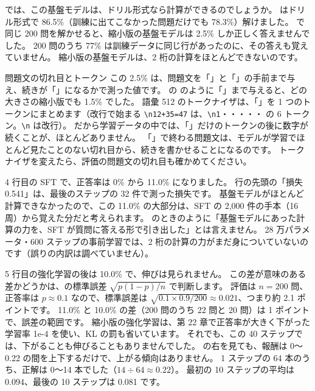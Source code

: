 では、この基盤モデルは、ドリル形式なら計算ができるのでしょうか。
 はドリル形式で 86.5\%（訓練に出てこなかった問題だけでも 78.3\%）解けました。
 で同じ 200 問を解かせると、縮小版の基盤モデルは 2.5\% しか正しく答えませんでした。
200 問のうち 77\% は訓練データに同じ行があったのに、その答えも覚えていません。
縮小版の基盤モデルは、2 桁の計算をほとんどできないのです。

\begin{caution}{問題文の切れ目とトークン}
この 2.5\% は、問題文を「」と「\code{=}」の手前まで与え、続きが「」になるかで測った値です。
 の  のように「」まで与えると、どの大きさの縮小版でも 1.5\% でした。
語彙 512 のトークナイザは、「」を 1 つのトークンにまとめます（改行で始まる \texttt{\textbackslash n12+35=47} は、\texttt{\textbackslash n1}・・・・・ の 6 トークン。\texttt{\textbackslash n} は改行）。
だから学習データの中では、「\code{=}」だけのトークンの後に数字が続くことが、ほとんどありません。
「\code{=}」で終わる問題文は、モデルが学習でほとんど見たことのない切れ目から、続きを書かせることになるのです。
トークナイザを変えたら、評価の問題文の切れ目も確かめてください。
\end{caution}

4 行目の SFT で、正答率は 0\% から 11.0\% になりました。
行の先頭の「損失 0.541」は、最後のステップの 32 件で測った損失です。
基盤モデルがほとんど計算できなかったので、この 11.0\% の大部分は、SFT の 2,000 件の手本（16 周）から覚えた分だと考えられます。
 のときのように「基盤モデルにあった計算の力を、SFT が質問に答える形で引き出した」とは言えません。
28 万パラメータ・600 ステップの事前学習では、2 桁の計算の力がまだ身についていないのです（誤りの内訳は調べていません）。

5 行目の強化学習の後は 10.0\% で、伸びは見られません。
この差が意味のある差かどうかは、の標準誤差 $\sqrt{p(1-p)/n}$ で判断します。
評価は $n=200$ 問、正答率は $p\approx0.1$ なので、標準誤差は $\sqrt{0.1\times0.9/200}\approx 0.021$、つまり約 2.1 ポイントです。
11.0\% と 10.0\% の差（200 問のうち 22 問と 20 問）は 1 ポイントで、誤差の範囲です。
縮小版の強化学習は、第 22 章で正答率が大きく下がった学習率 1e-4 を使い、KL の罰も省いています。
それでも、この 40 ステップでは、下がることも伸びることもありませんでした。
の右を見ても、報酬は 0〜0.22 の間を上下するだけで、上がる傾向はありません。
1 ステップの 64 本のうち、正解は 0〜14 本でした（$14\div64\approx0.22$）。
最初の 10 ステップの平均は 0.094、最後の 10 ステップは 0.081 です。

